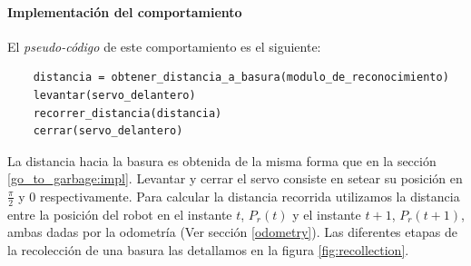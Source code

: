 \paragraph{Implementaci\'on del comportamiento}
El \emph{pseudo-c\'odigo} de este comportamiento es el siguiente:

\begin{verbatim}
    distancia = obtener_distancia_a_basura(modulo_de_reconocimiento)
    levantar(servo_delantero)
    recorrer_distancia(distancia)
    cerrar(servo_delantero)
\end{verbatim}

La distancia hacia la basura es obtenida de la misma forma que en la secci\'on
\ref{go_to_garbage:impl}. Levantar y cerrar el servo consiste en setear su
posici\'on en $\frac{\pi}{2}$ y $0$ respectivamente. Para calcular la distancia
recorrida utilizamos la distancia entre la posici\'on del robot en el
instante $t$, $P_r(t)$ y el instante $t+1$, $P_r(t+1)$, ambas dadas por la
odometr\'ia (Ver secci\'on \ref{odometry}). Las diferentes etapas de la
recolecci\'on de una basura las detallamos en la figura \ref{fig:recollection}.


